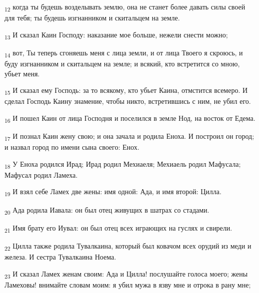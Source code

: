 \begin{tcolorbox}
\textsubscript{12} когда ты будешь возделывать землю, она не станет более давать силы своей для тебя; ты будешь изгнанником и скитальцем на земле.
\end{tcolorbox}
\begin{tcolorbox}
\textsubscript{13} И сказал Каин Господу: наказание мое больше, нежели снести можно;
\end{tcolorbox}
\begin{tcolorbox}
\textsubscript{14} вот, Ты теперь сгоняешь меня с лица земли, и от лица Твоего я скроюсь, и буду изгнанником и скитальцем на земле; и всякий, кто встретится со мною, убьет меня.
\end{tcolorbox}
\begin{tcolorbox}
\textsubscript{15} И сказал ему Господь: за то всякому, кто убьет Каина, отмстится всемеро. И сделал Господь Каину знамение, чтобы никто, встретившись с ним, не убил его.
\end{tcolorbox}
\begin{tcolorbox}
\textsubscript{16} И пошел Каин от лица Господня и поселился в земле Нод, на восток от Едема.
\end{tcolorbox}
\begin{tcolorbox}
\textsubscript{17} И познал Каин жену свою; и она зачала и родила Еноха. И построил он город; и назвал город по имени сына своего: Енох.
\end{tcolorbox}
\begin{tcolorbox}
\textsubscript{18} У Еноха родился Ирад; Ирад родил Мехиаеля; Мехиаель родил Мафусала; Мафусал родил Ламеха.
\end{tcolorbox}
\begin{tcolorbox}
\textsubscript{19} И взял себе Ламех две жены: имя одной: Ада, и имя второй: Цилла.
\end{tcolorbox}
\begin{tcolorbox}
\textsubscript{20} Ада родила Иавала: он был отец живущих в шатрах со стадами.
\end{tcolorbox}
\begin{tcolorbox}
\textsubscript{21} Имя брату его Иувал: он был отец всех играющих на гуслях и свирели.
\end{tcolorbox}
\begin{tcolorbox}
\textsubscript{22} Цилла также родила Тувалкаина, который был ковачом всех орудий из меди и железа. И сестра Тувалкаина Ноема.
\end{tcolorbox}
\begin{tcolorbox}
\textsubscript{23} И сказал Ламех женам своим: Ада и Цилла! послушайте голоса моего; жены Ламеховы! внимайте словам моим: я убил мужа в язву мне и отрока в рану мне;
\end{tcolorbox}
